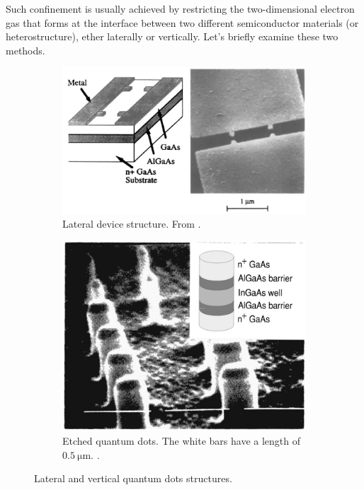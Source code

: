 \documentclass[a4paper,twoside,11pt]{book}
\begin{document}
Such confinement is usually achieved by restricting the two-dimensional electron gas that forms at the interface between two different semiconductor materials (or heterostructure), ether laterally or vertically. Let's briefly examine these two methods.

\begin{figure}[H]
	\centering
	\begin{subfigure}[t]{0.5\textwidth}
		\includegraphics[width=\textwidth]{Figure_5_Reimann}
		\caption{Lateral device structure. From \cite{Reimann2002}.}
		\label{fig:Figure_5_Reimann}
    \end{subfigure}
	\begin{subfigure}[t]{0.4\textwidth}
		\includegraphics[width=\textwidth]{Figure_4_Reimann}
		\caption{Etched quantum dots. The white bars have a length of $\SI{0.5}{\micro\meter}$. \cite{Reimann2002}.}
		\label{fig:Figure_4_Reimann}
    \end{subfigure}
    \caption{Lateral and vertical quantum dots structures.}
	\label{fig:Figures_4-5_Reimann}
\end{figure}
\end{document}
